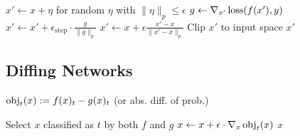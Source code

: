 \begin{algorithmic}
\State $x' \gets x + \eta$ for random $\eta$ with $\|\eta\|_p \le \epsilon$
    \State $g \gets \nabla_{x'} \operatorname{loss}(f(x'), y)$
    \State $x' \gets x' + \epsilon_\text{step} \cdot \frac{g}{\|g\|_p}$ 
        \State $x' \gets x + \epsilon \frac{x'-x}{\|x'-x\|_p}$
    \EndIf
    \State Clip $x'$ to input space
\EndFor
\State \Return $x'$
\EndFunction
\end{algorithmic}

\subsection*{Diffing Networks}
$\operatorname{obj}_t(x) := f(x)_t - g(x)_t$ (or abs. diff. of prob.)

\begin{algorithmic}
\State Select $x$ classified as $t$ by both $f$ and $g$
    \State $x \gets x + \epsilon \cdot \nabla_x \operatorname{obj}_t(x)$ 
\EndWhile
\State \Return $x$
\EndFunction
\end{algorithmic}